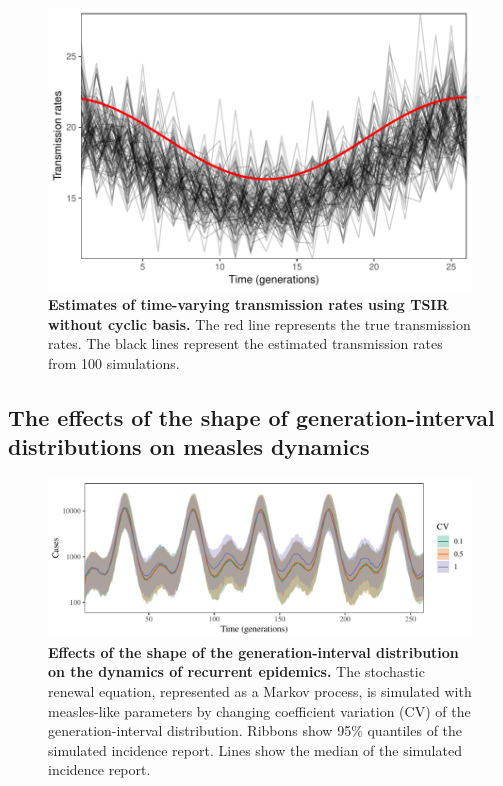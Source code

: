 \documentclass{article}
\begin{document}
\begin{figure}[!h]
\includegraphics[width=\textwidth]{../figure/tsir_transmission.pdf}
\caption{
\textbf{Estimates of time-varying transmission rates using TSIR without cyclic basis.}
The red line represents the true transmission rates. 
The black lines represent the estimated transmission rates from 100 simulations.
}
\end{figure}

\pagebreak
\subsection{The effects of the shape of generation-interval distributions on measles dynamics}

\begin{figure}[!h]
\includegraphics[width=\textwidth]{../figure/test_renewal_distribution.pdf}
\caption{
\textbf{Effects of the shape of the generation-interval distribution on the dynamics of recurrent epidemics.}
The stochastic renewal equation, represented as a Markov process, is simulated with measles-like parameters by changing coefficient variation (CV) of the generation-interval distribution.
Ribbons show 95\% quantiles of the simulated incidence report.
Lines show the median of the simulated incidence report.
}
\end{figure}
\end{document}
